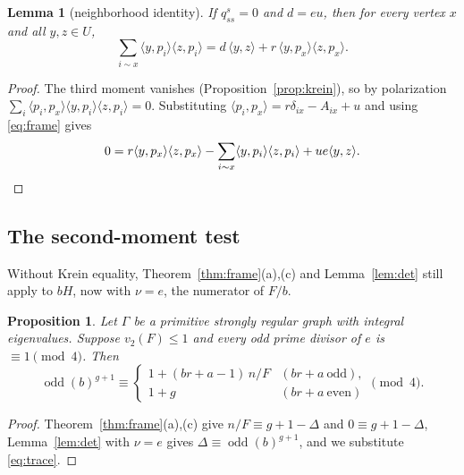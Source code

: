 \documentclass[11pt]{article}
\newtheorem{lemma}[theorem]{Lemma}
\newtheorem{proposition}[theorem]{Proposition}
\theoremstyle{definition}
\theoremstyle{remark}
\newcommand{\ip}[2]{\langle #1,#2\rangle}
\newcommand{\odd}{\operatorname{odd}}
\begin{document}
\begin{lemma}[neighborhood identity]\label{lem:nbhd}
If $q^s_{ss}=0$ and $d=eu$, then for every vertex $x$ and all $y,z\in U$,
\[
 \sum_{i\sim x}\ip y{p_i}\ip z{p_i}=d\,\ip yz+r\,\ip y{p_x}\ip z{p_x}.
\]
\end{lemma}

\begin{proof}
The third moment vanishes (Proposition~\ref{prop:krein}), so by polarization
$\sum_i\ip{p_i}{p_x}\ip y{p_i}\ip z{p_i}=0$. Substituting
$\ip{p_i}{p_x}=r\delta_{ix}-A_{ix}+u$ and using \eqref{eq:frame} gives
\[
 0=r\ip y{p_x}\ip z{p_x}-\sum_{i\sim x}\ip y{p_i}\ip z{p_i}+ue\ip yz .
 \qedhere
\]
\end{proof}

\subsection{The second-moment test}\label{sec:baseline}
Without Krein equality, Theorem~\ref{thm:frame}(a),(c) and Lemma~\ref{lem:det}
still apply to $bH$, now with $\nu=e$, the numerator of $F/b$.

\begin{proposition}\label{prop:second}
Let $\Gamma$ be a primitive strongly regular graph with integral eigenvalues.
Suppose $v_2(F)\le1$ and every odd prime divisor of $e$ is $\equiv1\pmod 4$.
Then
\[
 \odd(b)^{g+1}\equiv\begin{cases}1+(br+a-1)\,n/F&(br+a\ \text{odd}),\\
 1+g&(br+a\ \text{even})\end{cases}\pmod 4 .
\]
\end{proposition}

\begin{proof}
Theorem~\ref{thm:frame}(a),(c) give $n/F\equiv g+1-\Delta$ and
$0\equiv g+1-\Delta$, Lemma~\ref{lem:det} with $\nu=e$ gives
$\Delta\equiv\odd(b)^{g+1}$, and we substitute \eqref{eq:trace}.
\end{proof}
\end{document}
